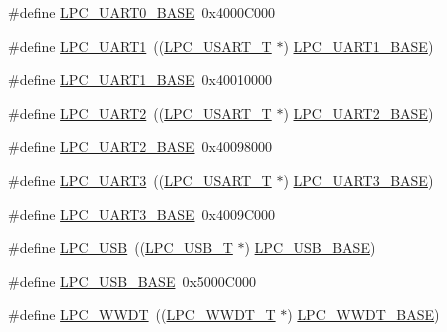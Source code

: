 \begin{DoxyCompactItemize}
\item 
\#define \hyperlink{group__PERIPH__175X__6X__BASE_gaa96fb70405a1298b350fc6f0ad0af997}{L\+P\+C\+\_\+\+U\+A\+R\+T0\+\_\+\+B\+A\+SE}~0x4000\+C000
\item 
\#define \hyperlink{group__PERIPH__175X__6X__BASE_ga83ea0dab4dcb7411c2e1de20050a4d2d}{L\+P\+C\+\_\+\+U\+A\+R\+T1}~((\hyperlink{structLPC__USART__T}{L\+P\+C\+\_\+\+U\+S\+A\+R\+T\+\_\+T}            $\ast$) \hyperlink{group__PERIPH__407X__8X__BASE_ga18e8f96b25e3f343bdd7ba552ae7a617}{L\+P\+C\+\_\+\+U\+A\+R\+T1\+\_\+\+B\+A\+SE})
\item 
\#define \hyperlink{group__PERIPH__175X__6X__BASE_ga18e8f96b25e3f343bdd7ba552ae7a617}{L\+P\+C\+\_\+\+U\+A\+R\+T1\+\_\+\+B\+A\+SE}~0x40010000
\item 
\#define \hyperlink{group__PERIPH__175X__6X__BASE_gac8badf231948fc9216d416c71a34e924}{L\+P\+C\+\_\+\+U\+A\+R\+T2}~((\hyperlink{structLPC__USART__T}{L\+P\+C\+\_\+\+U\+S\+A\+R\+T\+\_\+T}            $\ast$) \hyperlink{group__PERIPH__407X__8X__BASE_ga8c3873ab74db743465b038c74b365281}{L\+P\+C\+\_\+\+U\+A\+R\+T2\+\_\+\+B\+A\+SE})
\item 
\#define \hyperlink{group__PERIPH__175X__6X__BASE_ga8c3873ab74db743465b038c74b365281}{L\+P\+C\+\_\+\+U\+A\+R\+T2\+\_\+\+B\+A\+SE}~0x40098000
\item 
\#define \hyperlink{group__PERIPH__175X__6X__BASE_ga61c2bf57d66b50108cdec6878f9e8ee5}{L\+P\+C\+\_\+\+U\+A\+R\+T3}~((\hyperlink{structLPC__USART__T}{L\+P\+C\+\_\+\+U\+S\+A\+R\+T\+\_\+T}            $\ast$) \hyperlink{group__PERIPH__407X__8X__BASE_gac8dc517d5e03d4ca7666c18c89d5052e}{L\+P\+C\+\_\+\+U\+A\+R\+T3\+\_\+\+B\+A\+SE})
\item 
\#define \hyperlink{group__PERIPH__175X__6X__BASE_gac8dc517d5e03d4ca7666c18c89d5052e}{L\+P\+C\+\_\+\+U\+A\+R\+T3\+\_\+\+B\+A\+SE}~0x4009\+C000
\item 
\#define \hyperlink{group__PERIPH__175X__6X__BASE_gae77538a7f3f4850715c95283e38b423f}{L\+P\+C\+\_\+\+U\+SB}~((\hyperlink{structLPC__USB__T}{L\+P\+C\+\_\+\+U\+S\+B\+\_\+T}              $\ast$) \hyperlink{group__PERIPH__407X__8X__BASE_gaa619008881e9f76dc31131313eff1b79}{L\+P\+C\+\_\+\+U\+S\+B\+\_\+\+B\+A\+SE})
\item 
\#define \hyperlink{group__PERIPH__175X__6X__BASE_gaa619008881e9f76dc31131313eff1b79}{L\+P\+C\+\_\+\+U\+S\+B\+\_\+\+B\+A\+SE}~0x5000\+C000
\item 
\#define \hyperlink{group__PERIPH__175X__6X__BASE_ga235e068b1412366044449dba68194c55}{L\+P\+C\+\_\+\+W\+W\+DT}~((\hyperlink{structLPC__WWDT__T}{L\+P\+C\+\_\+\+W\+W\+D\+T\+\_\+T}             $\ast$) \hyperlink{group__PERIPH__407X__8X__BASE_ga9b83c39ba53f9c9e87974984c96e35de}{L\+P\+C\+\_\+\+W\+W\+D\+T\+\_\+\+B\+A\+SE})

\end{DoxyCompactItemize}
